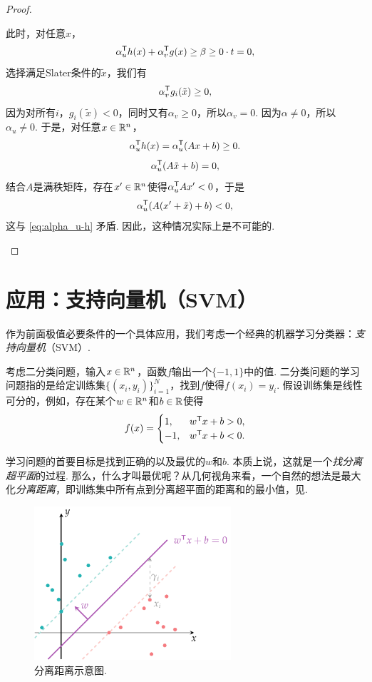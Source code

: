 \begin{proof}
\begin{itemize}
        此时，对任意$x$，
        \[\alpha_u^{\mathsf{T}} h(x)+\alpha_v^{\mathsf{T}} g(x)\geq\beta\geq 0\cdot t=0,\]
        选择满足Slater条件的$\tilde{x}$，我们有
        \[\alpha_v^{\mathsf{T}} g_i(\tilde{x})\geq 0,\]
        因为对所有$i$，$g_i(\tilde{x})<0$，同时又有$\alpha_v\geq 0$，所以$\alpha_v=0$. 因为$\alpha\neq 0$，所以$\alpha_u\neq 0$. 于是，对任意$x\in\mathbb{R}^n$，
        \begin{equation}
            \alpha_u^{\mathsf{T}} h(x)=\alpha_u^{\mathsf{T}}(Ax+b)\geq 0. \label{eq:alpha_u-h}
        \end{equation}
        \[\alpha_u^{\mathsf{T}} (A\tilde{x}+b)=0,\]
        结合$A$是满秩矩阵，存在$x'\in\mathbb{R}^n$使得$\alpha_u^{\mathsf{T}} Ax'<0$，于是
        \[\alpha_u^{\mathsf{T}} (A(x'+\tilde{x})+b)<0,\]
        这与 \eqref{eq:alpha_u-h} 矛盾. 因此，这种情况实际上是不可能的.
    \end{itemize}
\end{proof}


\section{应用：支持向量机（SVM）}

作为前面极值必要条件的一个具体应用，我们考虑一个经典的机器学习分类器：\emph{支持向量机}（SVM）. 

考虑二分类问题，输入$x\in \mathbb{R}^n$，函数$f$输出一个$\{-1,1\}$中的值. 二分类问题的学习问题指的是给定训练集$\{(x_i,y_i)\}_{i=1}^N$，找到$f$使得$f(x_i)=y_i$. 假设训练集是线性可分的，例如，存在某个$w\in \mathbb{R}^n$和$b\in \mathbb{R}$使得
    $$f(x)=\begin{cases}
		1,& w^{\mathsf{T}} x+b>0,\\
		-1, &w^{\mathsf{T}} x+b<0.
	\end{cases}$$

学习问题的首要目标是找到正确的以及最优的$w$和$b$. 本质上说，这就是一个\emph{找分离超平面}的过程. 那么，什么才叫最优呢？从几何视角来看，一个自然的想法是最大化\emph{分离距离}，即训练集中所有点到分离超平面的距离和的最小值，见.
\begin{figure}[ht]
    \centering
    \includegraphics[width=0.65\textwidth]{figures/duality/svm.pdf}
    \caption{分离距离示意图.}
    \label{fig:svm}
\end{figure}

